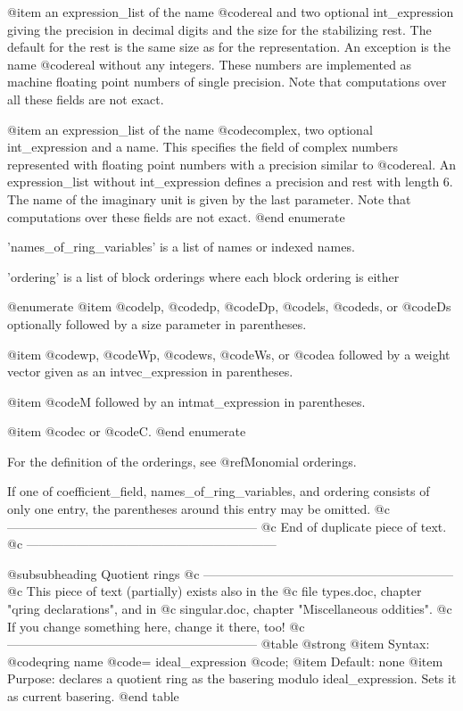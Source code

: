 @item
an expression_list of the name @code{real} and two optional int_expression
giving the precision in decimal digits and
the size for the stabilizing rest. The default for the rest is the same size
as for the representation.
An exception is the name @code{real} without any integers.
These numbers are implemented as machine floating point numbers
of single precision.
Note that computations over all these fields are not exact.

@item
an expression_list of the name @code{complex},
two optional int_expression and a name.
This specifies the field of complex numbers represented with floating point
numbers with a precision similar to @code{real}. An expression_list
without int_expression defines a precision and rest with length 6.
The name of the imaginary unit is given by the last parameter.
Note that computations over these fields are not exact.
@end enumerate

'names_of_ring_variables' is a list of names or indexed names.

'ordering' is a list of block orderings where each block ordering is either

@enumerate
@item
@code{lp}, @code{dp}, @code{Dp}, @code{ls}, @code{ds}, or @code{Ds}
optionally followed by a size parameter in parentheses.

@item
@code{wp}, @code{Wp}, @code{ws}, @code{Ws}, or @code{a} followed by a
weight vector given as an intvec_expression in parentheses.

@item
@code{M} followed by an intmat_expression in parentheses.

@item
@code{c} or @code{C}.
@end enumerate

For the definition of the orderings, see @ref{Monomial orderings}.

If one of coefficient_field, names_of_ring_variables, and ordering
consists of only one entry, the parentheses around this entry may be
omitted.
@c ------------------------------------------------------------
@c   End of duplicate piece of text.
@c ------------------------------------------------------------

@subsubheading Quotient rings
@c ------------------------------------------------------------
@c   This piece of text (partially) exists also in the
@c   file types.doc, chapter "qring declarations", and in
@c   singular.doc, chapter "Miscellaneous oddities".
@c   If you change something here, change it there, too!
@c ------------------------------------------------------------
@table @strong
@item Syntax:
@code{qring} name @code{=} ideal_expression @code{;}
@item Default:
none
@item Purpose:
declares a quotient ring as the basering modulo ideal_expression.  Sets
it as current basering.
@end table

